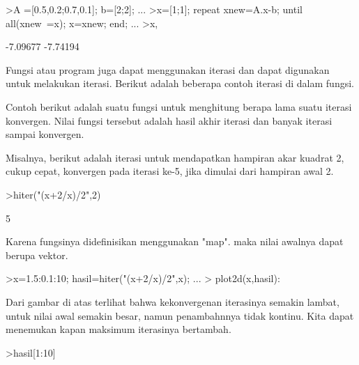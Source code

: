 \documentclass[a4paper,10pt]{article}
\begin{document}
\begin{eulernotebook}
\begin{eulercomment}
\begin{eulercomment}
\begin{eulercomment}
\begin{eulercomment}
\begin{eulercomment}
\begin{eulercomment}
\begin{eulercomment}
\begin{eulercomment}
\begin{eulercomment}
\begin{eulercomment}
\begin{eulercomment}
\begin{eulercomment}
\begin{eulercomment}
\begin{eulercomment}
\begin{eulercomment}
\begin{eulercomment}
\begin{eulercomment}
\begin{eulercomment}
\begin{eulerprompt}
>A =[0.5,0.2;0.7,0.1]; b=[2;2]; ...
>x=[1;1]; repeat xnew=A.x-b; until all(xnew~=x); x=xnew; end; ...
>x,
\end{eulerprompt}
\begin{euleroutput}
       -7.09677 
       -7.74194 
\end{euleroutput}
\begin{eulercomment}
Fungsi atau program juga dapat menggunakan iterasi dan dapat digunakan untuk melakukan iterasi. Berikut adalah beberapa contoh
iterasi di dalam fungsi.

Contoh berikut adalah suatu fungsi untuk menghitung berapa lama suatu iterasi konvergen. Nilai fungsi tersebut adalah hasil akhir
iterasi dan banyak iterasi sampai konvergen.
\end{eulercomment}
\begin{eulercomment}
Misalnya, berikut adalah iterasi untuk mendapatkan hampiran akar kuadrat 2, cukup cepat,
konvergen pada iterasi ke-5, jika dimulai dari hampiran awal 2.
\end{eulercomment}
\begin{eulerprompt}
>hiter("(x+2/x)/2",2)
\end{eulerprompt}
\begin{euleroutput}
  5
\end{euleroutput}
\begin{eulercomment}
Karena fungsinya didefinisikan menggunakan "map". maka nilai awalnya dapat berupa vektor.
\end{eulercomment}
\begin{eulerprompt}
>x=1.5:0.1:10; hasil=hiter("(x+2/x)/2",x); ...
>  plot2d(x,hasil):
\end{eulerprompt}
\begin{eulercomment}
Dari gambar di atas terlihat bahwa kekonvergenan iterasinya semakin lambat, untuk nilai awal
semakin besar, namun penambahnnya tidak kontinu. Kita dapat menemukan kapan maksimum
iterasinya bertambah.
\end{eulercomment}
\begin{eulerprompt}
>hasil[1:10]

\end{eulerprompt}
\end{eulercomment}
\end{eulercomment}
\end{eulercomment}
\end{eulercomment}
\end{eulercomment}
\end{eulercomment}
\end{eulercomment}
\end{eulercomment}
\end{eulercomment}
\end{eulercomment}
\end{eulercomment}
\end{eulercomment}
\end{eulercomment}
\end{eulercomment}
\end{eulercomment}
\end{eulercomment}
\end{eulercomment}
\end{eulercomment}
\end{eulernotebook}
\end{document}
